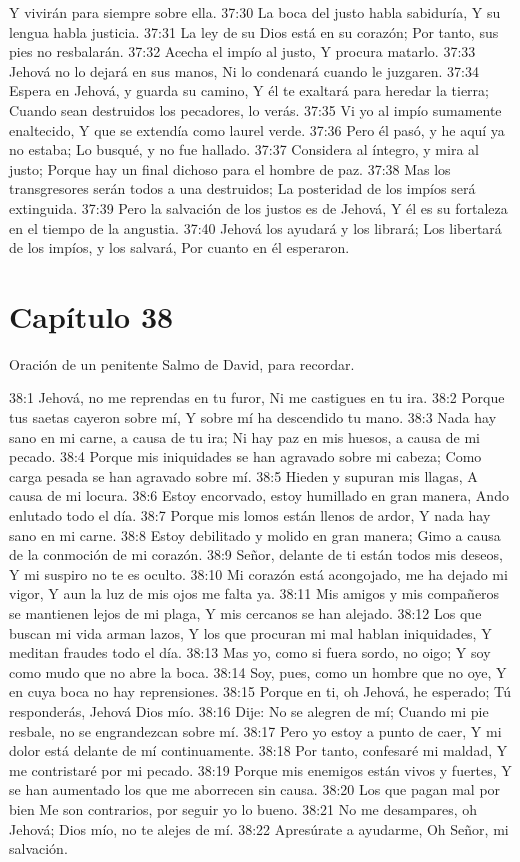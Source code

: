 Y vivirán para siempre sobre ella. 
37:30 La boca del justo habla sabiduría, 
Y su lengua habla justicia. 
37:31 La ley de su Dios está en su corazón; 
Por tanto, sus pies no resbalarán. 
37:32 Acecha el impío al justo, 
Y procura matarlo. 
37:33 Jehová no lo dejará en sus manos, 
Ni lo condenará cuando le juzgaren. 
37:34 Espera en Jehová, y guarda su camino, 
Y él te exaltará para heredar la tierra; 
Cuando sean destruidos los pecadores, lo verás. 
37:35 Vi yo al impío sumamente enaltecido, 
Y que se extendía como laurel verde. 
37:36 Pero él pasó, y he aquí ya no estaba; 
Lo busqué, y no fue hallado. 
37:37 Considera al íntegro, y mira al justo; 
Porque hay un final dichoso para el hombre de paz. 
37:38 Mas los transgresores serán todos a una destruidos; 
La posteridad de los impíos será extinguida. 
37:39 Pero la salvación de los justos es de Jehová, 
Y él es su fortaleza en el tiempo de la angustia. 
37:40 Jehová los ayudará y los librará; 
Los libertará de los impíos, y los salvará, 
Por cuanto en él esperaron. 
\section*{Capítulo 38}
Oración de un penitente 
Salmo de David, para recordar. 
 
38:1 Jehová, no me reprendas en tu furor, 
Ni me castigues en tu ira. 
38:2 Porque tus saetas cayeron sobre mí, 
Y sobre mí ha descendido tu mano. 
38:3 Nada hay sano en mi carne, a causa de tu ira; 
Ni hay paz en mis huesos, a causa de mi pecado. 
38:4 Porque mis iniquidades se han agravado sobre mi cabeza; 
Como carga pesada se han agravado sobre mí. 
38:5 Hieden y supuran mis llagas, 
A causa de mi locura. 
38:6 Estoy encorvado, estoy humillado en gran manera, 
Ando enlutado todo el día. 
38:7 Porque mis lomos están llenos de ardor, 
Y nada hay sano en mi carne. 
38:8 Estoy debilitado y molido en gran manera; 
Gimo a causa de la conmoción de mi corazón. 
38:9 Señor, delante de ti están todos mis deseos, 
Y mi suspiro no te es oculto. 
38:10 Mi corazón está acongojado, me ha dejado mi vigor, 
Y aun la luz de mis ojos me falta ya. 
38:11 Mis amigos y mis compañeros se mantienen lejos de mi plaga, 
Y mis cercanos se han alejado. 
38:12 Los que buscan mi vida arman lazos, 
Y los que procuran mi mal hablan iniquidades, 
Y meditan fraudes todo el día. 
38:13 Mas yo, como si fuera sordo, no oigo; 
Y soy como mudo que no abre la boca. 
38:14 Soy, pues, como un hombre que no oye, 
Y en cuya boca no hay reprensiones. 
38:15 Porque en ti, oh Jehová, he esperado; 
Tú responderás, Jehová Dios mío. 
38:16 Dije: No se alegren de mí; 
Cuando mi pie resbale, no se engrandezcan sobre mí. 
38:17 Pero yo estoy a punto de caer, 
Y mi dolor está delante de mí continuamente. 
38:18 Por tanto, confesaré mi maldad, 
Y me contristaré por mi pecado. 
38:19 Porque mis enemigos están vivos y fuertes, 
Y se han aumentado los que me aborrecen sin causa. 
38:20 Los que pagan mal por bien 
Me son contrarios, por seguir yo lo bueno. 
38:21 No me desampares, oh Jehová; 
Dios mío, no te alejes de mí. 
38:22 Apresúrate a ayudarme, 
Oh Señor, mi salvación. 

